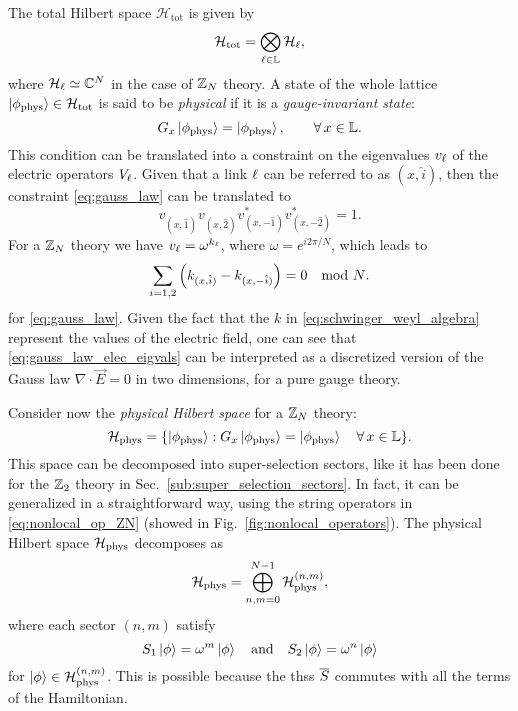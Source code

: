 The total Hilbert space $\mathcal{H}_{\text{tot}}$ is given by
\begin{equation}
    \mathcal{H}_{\text{tot}} = \bigotimes_{\ell \in \mathbb{L}} \mathcal{H}_{\ell},
\end{equation}
where $\mathcal{H}_\ell \simeq \mathbb{C}^N$ in the case of $\mathbb{Z}_N$ theory.
A state of the whole lattice $\ket{\phi_{\text{phys}}} \in \mathcal{H}_{\text{tot}}$ is said to be \emph{physical} if it is a \emph{gauge-invariant state}:
\begin{equation}
    G_x \ket{\phi_{\text{phys}}} = \ket{\phi_{\text{phys}}}, \qquad \forall \, x \in \mathbb{L}.
    \label{eq:gauss_law}
\end{equation}
This condition can be translated into a constraint on the eigenvalues $v_{\ell}$ of the electric operators $V_{\ell}$.
Given that a link $\ell$ can be referred to as $(x, \hat{i})$,  then the constraint \eqref{eq:gauss_law} can be translated to
\begin{equation}
    v_{(x, \hat{1})}^{\phantom{\ast}}
    v_{(x, \hat{2})}^{\phantom{\ast}}
    v_{(x, -\hat{1})}^\ast
    v_{(x, -\hat{2})}^\ast = 1.
\end{equation}
For a $\mathbb{Z}_N$ theory we have $v_\ell = \omega^{k_{\ell}}$, where $\omega = e^{i2 \pi / N}$, which leads to
\begin{equation}
    \sum_{i=1,2} \pqty{ k_{(x, \hat{i})} - k_{(x, -\hat{i})} } = 0 \quad \text{mod $N$}.
    \label{eq:gauss_law_elec_eigvals}
\end{equation}
for \eqref{eq:gauss_law}.
Given the fact that the $k$ in \eqref{eq:schwinger_weyl_algebra} represent the values of the electric field, one can see that \eqref{eq:gauss_law_elec_eigvals} can be interpreted as a discretized version of the Gauss law $\nabla \cdot \vec{E} = 0$ in two dimensions, for a pure gauge theory.

Consider now the \emph{physical Hilbert space} for a $\mathbb{Z}_N$ theory:
\begin{equation}
    \mathcal{H}_{\text{phys}} = \{ \ket{\phi_{\text{phys}}} : G_x \ket{\phi_{\text{phys}}} = \ket{\phi_{\text{phys}}} \quad \forall \, x \in \mathbb{L} \}.
    \label{eq:decomposizione_Hphys}
\end{equation}
This space can be decomposed into super-selection sectors, like it has been done for the $\mathbb{Z}_2$ theory in Sec.~\ref{sub:super_selection_sectors}.
In fact, it can be generalized in a straightforward way, using the string operators in \eqref{eq:nonlocal_op_ZN} (showed in Fig.~\ref{fig:nonlocal_operators}).
The physical Hilbert space $\mathcal{H}_{\text{phys}}$ decomposes as
\begin{equation}
    \mathcal{H}_{\text{phys}} = \bigoplus_{n,m=0}^{N-1} \mathcal{H}_{\text{phys}}^{(n,m)},
\end{equation}
where each sector $(n,m)$ satisfy
\begin{equation}
    S_1 \ket{\phi} = \omega^{m} \ket{\phi}
    \qand
    S_2 \ket{\phi} = \omega^{n} \ket{\phi}
\end{equation}
for $\ket{\phi} \in \mathcal{H}_{\text{phys}}^{(n,m)}$.
This is possible because the \ac{ths}s $\overline{S}$ commutes with all the terms of the Hamiltonian.

